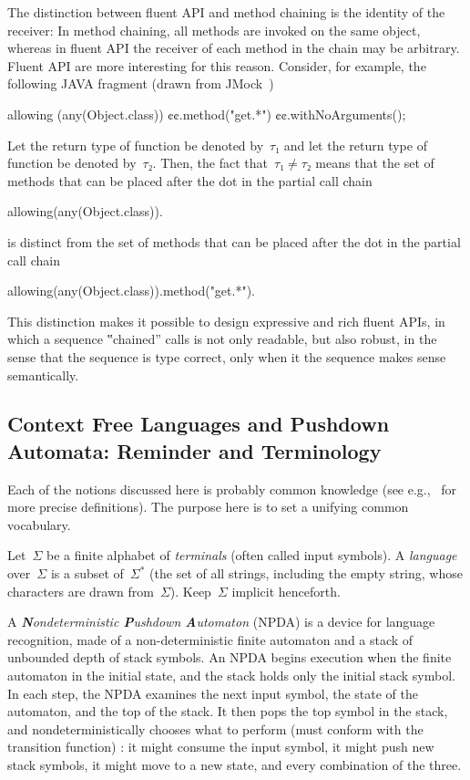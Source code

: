 The distinction between fluent API and method chaining is the identity of the receiver:
In method chaining, all methods are invoked on the same object, whereas in fluent API
  the receiver of each method in the chain may be arbitrary.
Fluent API are more interesting for this reason.
Consider, for example, the following JAVA fragment (drawn from JMock~\cite{Freeman:Pryce:06})
\begin{JAVA}
allowing (any(Object.class))
  ¢¢.method("get.*")
  ¢¢.withNoArguments();
\end{JAVA}
Let the return type of function  be denoted by~$τ₁$ and let the
  return type of function  be denoted by~$τ₂$.
Then, the fact that~$τ₁≠τ₂$ means that the set of methods that can be placed after the dot
  in the partial call chain
\begin{JAVA}
allowing(any(Object.class)).
\end{JAVA}
is distinct from the set of methods that can be placed after the dot in the partial call chain
\begin{JAVA}
allowing(any(Object.class)).method("get.*").
\end{JAVA}
This distinction makes it possible to design expressive and rich fluent APIs, in which a
  sequence ‟chained” calls is not only readable, but also robust, in the sense that the
  sequence is type correct, only when it the sequence makes sense semantically.

\subsection{Context Free Languages and Pushdown Automata: Reminder and Terminology}
Each of the notions discussed here is probably common knowledge
 (see e.g.,~\cite{Hopcroft:book:2001,Linz:2001} for more precise definitions).
The purpose here is to set a unifying common vocabulary.

Let~$Σ$ be a finite alphabet of \emph{terminals} (often called input symbols).
A \emph{language} over~$Σ$
  is a subset of~$Σ^*$ (the set of all strings, including the empty string,
  whose characters are drawn from~$Σ$).
Keep~$Σ$ implicit henceforth.

A \emph{\textbf Nondeterministic \textbf Pushdown \textbf Automaton} (NPDA) is a device for language recognition,
  made of a non-deterministic finite automaton
  and a stack of unbounded depth of stack symbols.
An NPDA begins execution when the finite automaton in the initial state, and the stack holds only the initial stack symbol.
In each step, the NPDA 
  examines the next input symbol,
  the state of the automaton,
  and the top of the stack.
It then pops the top symbol in the stack, and nondeterministically chooses what to perform (must conform with the transition function) : 
  it might consume the input symbol,
  it might push new stack symbols, 
  it might move to a new state,
  and every combination of the three.

